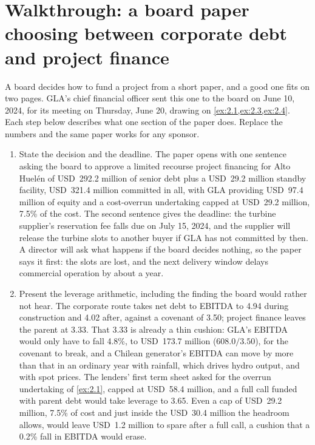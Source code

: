 \section{Walkthrough: a board paper choosing between corporate debt and project finance}\label{sec:2.8}

A board decides how to fund a project from a short paper, and a good one fits on two pages. GLA's chief financial officer sent this one to the board on June 10, 2024, for its meeting on Thursday, June 20, drawing on \cref{ex:2.1,ex:2.3,ex:2.4}. Each step below describes what one section of the paper does. Replace the numbers and the same paper works for any sponsor.

\begin{enumerate}
\item State the decision and the deadline. The paper opens with one sentence asking the board to approve a limited recourse project financing for Alto Huelén of USD~292.2 million of senior debt plus a USD~29.2 million standby facility, USD~321.4 million committed in all, with GLA providing USD~97.4 million of equity and a cost-overrun undertaking capped at USD~29.2 million, 7.5\% of the cost. The second sentence gives the deadline: the turbine supplier's reservation fee falls due on July 15, 2024, and the supplier will release the turbine slots to another buyer if GLA has not committed by then. A director will ask what happens if the board decides nothing, so the paper says it first: the slots are lost, and the next delivery window delays commercial operation by about a year.

\item Present the leverage arithmetic, including the finding the board would rather not hear. The corporate route takes net debt to EBITDA to 4.94\x{} during construction and 4.02\x{} after, against a covenant of 3.50\x; project finance leaves the parent at 3.33\x. That 3.33\x{} is already a thin cushion: GLA's EBITDA would only have to fall 4.8\%, to USD~173.7 million ($608.0 / 3.50$), for the covenant to break, and a Chilean generator's EBITDA can move by more than that in an ordinary year with rainfall, which drives hydro output, and with spot prices. The lenders' first term sheet asked for the overrun undertaking of \cref{ex:2.1}, capped at USD~58.4 million, and a full call funded with parent debt would take leverage to 3.65\x. Even a cap of USD~29.2 million, 7.5\% of cost and just inside the USD~30.4 million the headroom allows, would leave USD~1.2 million to spare after a full call, a cushion that a 0.2\% fall in EBITDA would erase.


\end{enumerate}
